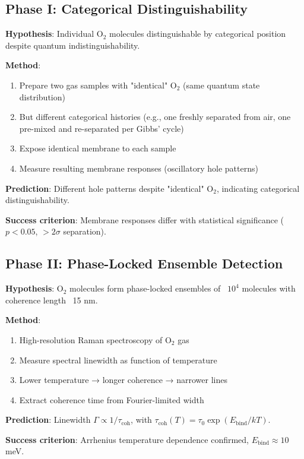\documentclass[11pt,a4paper]{article}
\theoremstyle{definition}
\theoremstyle{remark}
\begin{document}
\subsection{Phase I: Categorical Distinguishability}

\begin{experiment}
\textbf{Hypothesis}: Individual O$_2$ molecules distinguishable by categorical position despite quantum indistinguishability.

\textbf{Method}:
\begin{enumerate}
\item Prepare two gas samples with "identical" O$_2$ (same quantum state distribution)
\item But different categorical histories (e.g., one freshly separated from air, one pre-mixed and re-separated per Gibbs' cycle)
\item Expose identical membrane to each sample
\item Measure resulting membrane responses (oscillatory hole patterns)
\end{enumerate}

\textbf{Prediction}: Different hole patterns despite "identical" O$_2$, indicating categorical distinguishability.

\textbf{Success criterion}: Membrane responses differ with statistical significance ($p < 0.05$, $>2\sigma$ separation).
\end{experiment}

\subsection{Phase II: Phase-Locked Ensemble Detection}

\begin{experiment}
\textbf{Hypothesis}: O$_2$ molecules form phase-locked ensembles of ~$10^4$ molecules with coherence length ~15 nm.

\textbf{Method}:
\begin{enumerate}
\item High-resolution Raman spectroscopy of O$_2$ gas
\item Measure spectral linewidth as function of temperature
\item Lower temperature → longer coherence → narrower lines
\item Extract coherence time from Fourier-limited width
\end{enumerate}

\textbf{Prediction}: Linewidth $\Gamma \propto 1/\tau_{\text{coh}}$, with $\tau_{\text{coh}}(T) = \tau_0 \exp(E_{\text{bind}}/kT)$.

\textbf{Success criterion}: Arrhenius temperature dependence confirmed, $E_{\text{bind}} \approx 10$ meV.
\end{experiment}
\end{document}
